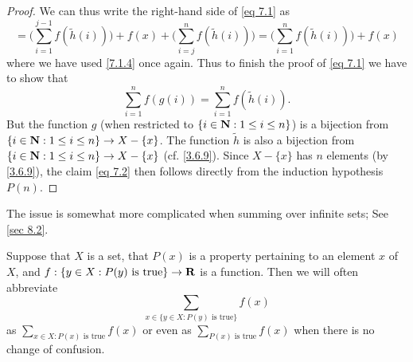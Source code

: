 \begin{proof}
  We can thus write the right-hand side of \eqref{eq 7.1} as
  \[
    = \Bigg(\sum_{i = 1}^{j - 1} f(\tilde{h}(i))\Bigg) + f(x) + \Bigg(\sum_{i = j}^n f(\tilde{h}(i))\Bigg) = \Bigg(\sum_{i = 1}^n f(\tilde{h}(i))\Bigg) + f(x)
  \]
  where we have used \cref{7.1.4} once again.
  Thus to finish the proof of \eqref{eq 7.1} we have to show that
  \[
    \sum_{i = 1}^n f(g(i)) = \sum_{i = 1}^n f(\tilde{h}(i)). \tag{7.2}\label{eq 7.2}
  \]
  But the function \(g\) (when restricted to \(\{i \in \mathbf{N} : 1 \leq i \leq n\}\)) is a bijection from \(\{i \in \mathbf{N} : 1 \leq i \leq n\} \to X - \{x\}\).
  The function \(\tilde{h}\) is also a bijection from \(\{i \in \mathbf{N} : 1 \leq i \leq n\} \to X - \{x\}\) (cf. \cref{3.6.9}).
  Since \(X - \{x\}\) has \(n\) elements (by \cref{3.6.9}), the claim \eqref{eq 7.2} then follows directly from the induction hypothesis \(P(n)\).
\end{proof}

\begin{remark}\label{7.1.9}
  The issue is somewhat more complicated when summing over infinite sets;
  See \cref{sec 8.2}.
\end{remark}

\begin{remark}\label{7.1.10}
  Suppose that \(X\) is a set, that \(P(x)\) is a property pertaining to an element \(x\) of \(X\), and \(f : \{y \in X : P(y) \text{ is true}\} \to \mathbf{R}\) is a function.
  Then we will often abbreviate
  \[
    \sum_{x \in \{y \in X : P(y) \text{ is true}\}} f(x)
  \]
  as \(\sum_{x \in X : P(x) \text{ is true}} f(x)\) or even as \(\sum_{P(x) \text{ is true}} f(x)\) when there is no change of confusion.
\end{remark}

